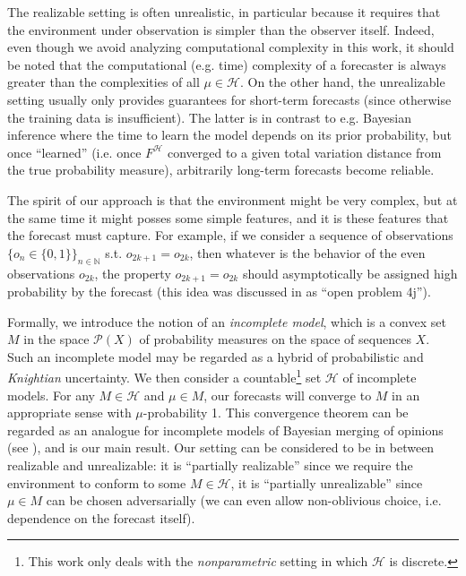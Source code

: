\documentclass[11pt]{article}
\theoremstyle{definition}
\theoremstyle{plain}
\newcommand{\Nats}{\mathbb{N}}
\newcommand{\PM}{\mathcal{P}}
\newcommand{\MC}{\mathcal{H}}
\begin{document}
The realizable setting is often unrealistic, in particular because it requires that the environment under observation is simpler than the observer itself. Indeed, even though we avoid analyzing computational complexity in this work, it should be noted that the computational (e.g. time) complexity of a forecaster is always greater than the complexities of all $\mu \in \MC$. On the other hand, the unrealizable setting usually only provides guarantees for short-term forecasts (since otherwise the training data is insufficient). The latter is in contrast to e.g. Bayesian inference where the time to learn the model depends on its prior probability, but once \enquote{learned} (i.e. once $F^\MC$ converged to a given total variation distance from the true probability measure), arbitrarily long-term forecasts become reliable.

The spirit of our approach is that the environment might be very complex, but at the same time it might posses some simple features, and it is these features that the forecast must capture. For example, if we consider a sequence of observations $\{o_n \in \{0,1\}\}_{n \in \Nats}$ s.t. $o_{2k+1}=o_{2k}$, then whatever is the behavior of the even observations $o_{2k}$, the property $o_{2k+1}=o_{2k}$ should asymptotically be assigned high probability by the forecast (this idea was discussed in \cite{Hutter_2009} as \enquote{open problem 4j}).

Formally, we introduce the notion of an \emph{incomplete model}, which is a convex set $M$ in the space $\PM(X)$ of probability measures on the space of sequences $X$. Such an incomplete model may be regarded as a hybrid of probabilistic and \emph{Knightian} uncertainty. We then consider a countable\footnote{This work only deals with the \emph{nonparametric} setting in which $\MC$ is discrete.} set $\MC$ of incomplete models. For any $M \in \MC$ and $\mu \in M$, our forecasts will converge to $M$ in an appropriate sense with $\mu$-probability 1. This convergence theorem can be regarded as an analogue for incomplete models of Bayesian merging of opinions (see \cite{Blackwell_1962}), and is our main result. Our setting can be considered to be in between realizable and unrealizable: it is \enquote{partially realizable} since we require the environment to conform to some $M \in \MC$, it is \enquote{partially unrealizable} since $\mu \in M$ can be chosen adversarially (we can even allow non-oblivious choice, i.e. dependence on the forecast itself).
\end{document}
